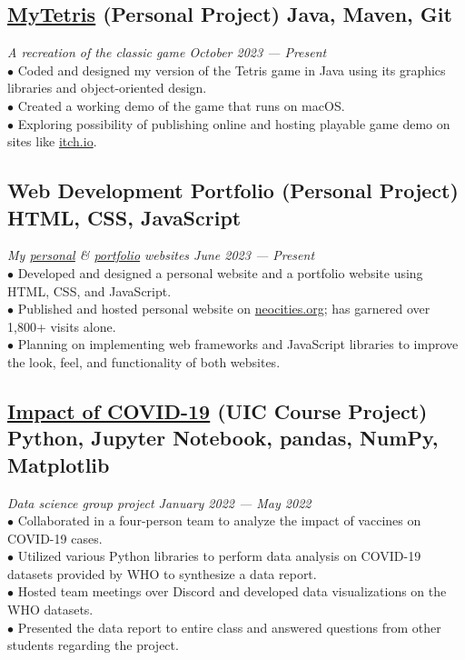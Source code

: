 \documentclass{article}
\begin{document}
\subsection{\href{https://github.com/IanLulu/MyTetris}{\underline{MyTetris}} (Personal Project) \hfill \textnormal{Java, Maven, Git}}
\vspace{-0.5em}
\textit{A recreation of the classic game \hfill October 2023 --- Present}
\\
$\bullet$ Coded and designed my version of the Tetris game in Java using its graphics libraries and object-oriented design.
\\
$\bullet$ Created a working demo of the game that runs on macOS.
\\
$\bullet$ Exploring possibility of publishing online and hosting playable game demo on sites like \url{itch.io}.
\vspace{-0.5em}

\subsection{Web Development Portfolio (Personal Project) \hfill \textnormal{HTML, CSS, JavaScript}}
\vspace{-0.5em}
\textit{My \href{https://github.com/IanLulu/neocities-website}{\underline{personal}} \& \href{https://github.com/IanLulu/ianlulu.github.io}{\underline{portfolio}} websites \hfill June 2023 --- Present}
\\
$\bullet$ Developed and designed a personal website and a portfolio website using HTML, CSS, and JavaScript.
\\
$\bullet$ Published and hosted personal website on \url{neocities.org}; has garnered over 1,800+ visits alone.
\\
$\bullet$ Planning on implementing web frameworks and JavaScript libraries to improve the look, feel, and functionality of both websites.
\vspace{-0.5em}

\subsection{\href{https://github.com/uic-cs418/cs418-spring22-the-wild-card}{\underline{Impact of COVID-19}} (UIC Course Project) \hfill \textnormal{Python, Jupyter Notebook, pandas, NumPy, Matplotlib}}
\vspace{-0.5em}
\textit{Data science group project \hfill January 2022 --- May 2022}
\\
$\bullet$ Collaborated in a four-person team to analyze the impact of vaccines on COVID-19 cases.
\\
$\bullet$ Utilized various Python libraries to perform data analysis on COVID-19 datasets provided by WHO to synthesize a data report.
\\
$\bullet$ Hosted team meetings over Discord and developed data visualizations on the WHO datasets.
\\
$\bullet$ Presented the data report to entire class and answered questions from other students regarding the project.
\end{document}
